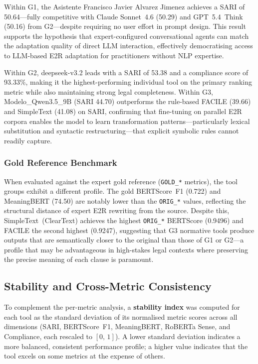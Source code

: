 \documentclass[12pt, a4paper]{article}
\begin{document}
Within G1, the Asistente Francisco Javier Alvarez Jimenez achieves a SARI of
50.64---fully competitive with Claude Sonnet~4.6 (50.29) and GPT~5.4~Think (50.16) from
G2---despite requiring no user effort in prompt design. This result supports the
hypothesis that expert-configured conversational agents can match the adaptation quality
of direct LLM interaction, effectively democratising access to LLM-based E2R adaptation
for practitioners without NLP expertise.

Within G2, deepseek-v3.2 leads with a SARI of 53.38 and a compliance score of 93.33\%,
making it the highest-performing individual tool on the primary ranking metric while also
maintaining strong legal completeness. Within G3, Modelo\_Qwen3.5\_9B (SARI 44.70)
outperforms the rule-based FACILE (39.66) and SimpleText (41.08) on SARI, confirming that
fine-tuning on parallel E2R corpora enables the model to learn transformation
patterns---particularly lexical substitution and syntactic restructuring---that explicit
symbolic rules cannot readily capture.

\subsubsection{Gold Reference Benchmark}
\label{sssec:gold-benchmark}

When evaluated against the expert gold reference (\texttt{GOLD\_*} metrics), the tool
groups exhibit a different profile. The gold BERTScore~F1 (0.722) and MeaningBERT (74.50)
are notably lower than the \texttt{ORIG\_*} values, reflecting the structural distance of
expert E2R rewriting from the source. Despite this, SimpleText~(ClearText) achieves the
highest \texttt{ORIG\_*} BERTScore (0.9496) and FACILE the second highest (0.9247),
suggesting that G3 normative tools produce outputs that are semantically closer to the
original than those of G1 or G2---a profile that may be advantageous in high-stakes legal
contexts where preserving the precise meaning of each clause is paramount.

\subsection{Stability and Cross-Metric Consistency}
\label{ssec:stability}

To complement the per-metric analysis, a \textbf{stability index} was computed for each
tool as the standard deviation of its normalised metric scores across all dimensions
(SARI, BERTScore~F1, MeaningBERT, RoBERTa Sense, and Compliance, each rescaled to
$[0,\,1]$). A lower standard deviation indicates a more balanced, consistent performance
profile; a higher value indicates that the tool excels on some metrics at the expense of
others.
\end{document}
